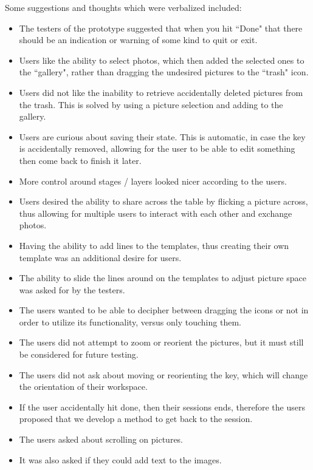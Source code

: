 \documentclass{tei2013}
\begin{document}
Some suggestions and thoughts which were verbalized included:
\begin{itemize}
\item The testers of the prototype suggested that when you hit ``Done" that there should be an indication or warning of some kind to quit or exit. 
\item Users like the ability to select photos, which then added the selected ones to the ``gallery", rather than dragging the undesired pictures to the ``trash" icon.
\item Users did not like the inability to retrieve accidentally deleted pictures from the trash. This is solved by using a picture selection and adding to the gallery.
\item Users are curious about saving their state. This is automatic, in case the key is accidentally removed, allowing for the user to be able to edit something then come back to finish it later. 
\item More control around stages / layers looked nicer according to the users. 
\item Users desired the ability to share across the table by flicking a picture across, thus allowing for multiple users to interact with each other and exchange photos. 
\item Having the ability to add lines to the templates, thus creating their own template was an additional desire for users. 
\item The ability to slide the lines around on the templates to adjust picture space was asked for by the testers. 
\item The users wanted to be able to decipher between dragging the icons or not in order to utilize its functionality, versus only touching them. 
\item The users did not attempt to zoom or reorient the pictures, but it must still be considered for future testing. 
\item The users did not ask about moving or reorienting the key, which will change the orientation of their workspace. 
\item If the user accidentally hit done, then their sessions ends, therefore the users proposed that we develop a method to get back to the session. 
\item The users asked about scrolling on pictures.
\item It was also asked if they could add text to the images.
%

\end{itemize}
\end{document}
